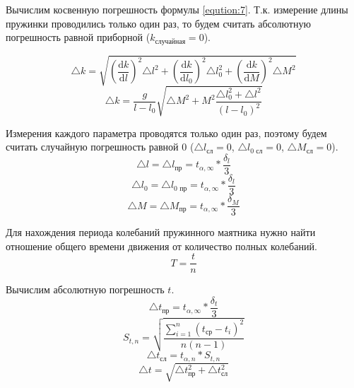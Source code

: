 Вычислим косвенную погрешность формулы \ref{eqution:7}. Т.к. измерение длины пружинки проводились только один раз, то будем считать абсолютную погрешность равной приборной ($k_{\text{случайная}} = 0$). 

\begin{equation}
	\label{eqution: 8}
	\triangle k = \sqrt{(\frac{\mathrm d k}{\mathrm d l})^2 \triangle l^2 + (\frac{\mathrm d k}{\mathrm d l_0})^2 \triangle l_0^2 + (\frac{\mathrm d k}{\mathrm d M})^2 \triangle M^2}
\end{equation}
\begin{equation}
	\label{eqution: 9}
	\triangle k = \frac{g}{l - l_0} \sqrt{\triangle M^2 + M^2 \frac{\triangle l_0^2 + \triangle l^2
		}{(l - l_0)^2}}
\end{equation}

Измерения каждого параметра проводятся только один раз, поэтому будем считать случайную погрешность равной 0 ($\triangle l_{\text{сл}} = 0$, $\triangle l_{\text{0 сл}} = 0$, $\triangle M_{\text{сл}} = 0$).
\begin{equation}
	\label{eqution: 12}
	\triangle l = \triangle l_{\text{пр}} = t_{\alpha, \infty} * \frac{\delta _l}{3}
\end{equation}
\begin{equation}
	\label{eqution: 13}
	\triangle l_0 = \triangle l_{\text{0 пр}} = t_{\alpha, \infty} * \frac{\delta _{l}}{3}
\end{equation}
\begin{equation}
	\label{eqution: 17}
	\triangle M = \triangle M_{\text{пр}} = t_{\alpha, \infty} * \frac{\delta _{M}}{3}
\end{equation}


Для нахождения периода колебаний пружинного маятника нужно найти отношение общего времени движения от количество полных колебаний.
\begin{equation}
	\label{eqution: 10}
	T = \frac{t}{n}
\end{equation}

Вычислим абсолютную погрешность $t$.
\begin{equation}
	\label{eqution: 20}
	\triangle t_{\text{пр}} = t_{\alpha, \infty} * \frac{\delta _t}{3}
\end{equation}
\begin{equation}
	\label{equation: 11}
	S_{t, n} = \sqrt{\frac{\sum_{i = 1}^{n} (t_{\text{ср}} - t_i)^2}{n(n-1)}}
\end{equation}
\begin{equation}
	\label{eqution: 25}
	\triangle t_{\text{сл}} = t_{\alpha, n} * S_{t, n}
\end{equation}
\begin{equation}
	\label{equation: 10}
	\triangle t = \sqrt{\triangle t_\text{пр} ^2 + \triangle t_\text{сл} ^2}
\end{equation}


